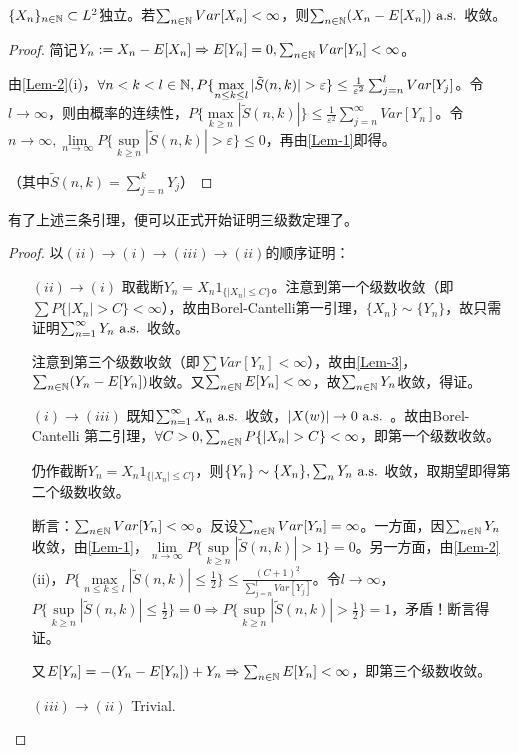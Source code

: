 \documentclass{ctexart}
\begin{document}
\begin{Lemma}\label{Lem-3}
  $\{X_{n}\}_{n\in\mathbb{N}}\subset L^{2}$独立。若$\sum_{n\in\mathbb{N}}Var[X_{n}]<\infty$，则$\sum_{n\in\mathbb{N}}(X_{n}-E[X_{n}])\text{ a.s. }$收敛。
\end{Lemma}
\begin{proof}
 简记$Y_{n}:=X_{n}-E[X_{n}]\Rightarrow E[Y_{n}]=0,\sum_{n\in\mathbb{N}}Var[Y_{n}]<\infty$。

  由\ref{Lem-2}(i)，$\forall n<k<l\in\N, P\{\max\limits_{n\leq k\leq l}|\tilde S(n,k)|>\varepsilon\}\leq \frac{1}{\varepsilon^{2}}\sum_{j=n}^{l}Var[Y_{j}]$。令$l\to\infty$，则由概率的连续性，$P\{\max\limits_{k\geq n}|\tilde{S}(n,k)|\}\leq\frac{1}{\varepsilon^{2}}\sum_{j=n}^{\infty}Var[Y_{n}]$。令$n\to\infty, \lim\limits_{n\to\infty}P\{\sup\limits_{k\geq n}|\tilde{S}(n,k)|>\varepsilon\}\leq 0$，再由\ref{Lem-1}即得。
  
  （其中$\tilde S(n,k)=\sum_{j=n}^{k}Y_{j}$）
\end{proof}
有了上述三条引理，便可以正式开始证明三级数定理了。
\begin{proof}
以$(ii)\to(i)\to (iii)\to (ii)$的顺序证明：
  \begin{itemize}
  \item[$(ii)\to (i)$] 取截断$Y_{n}=X_{n}1_{\{|X_{n}|\leq C\}}$。注意到第一个级数收敛（即$\sum P\{|X_{n}|>C\}<\infty$），故由Borel-Cantelli第一引理，$\{X_{n}\}\sim \{Y_{n}\}$，故只需证明$\sum_{n=1}^{\infty}Y_{n}\text{ a.s. }$收敛。

    注意到第三个级数收敛（即$\sum Var[Y_{n}]<\infty$），故由\ref{Lem-3}，$\sum_{n\in\mathbb{N}}(Y_{n}-E[Y_{n}])$收敛。又$\sum_{n\in\mathbb{N}}E[Y_{n}]<\infty$，故$\sum_{n\in\mathbb{N}} Y_{n}$收敛，得证。

  \item[$(i)\to (iii)$] 既知$\sum_{n=1}^{\infty} X_{n}\text{ a.s. }$收敛，$|X(w)|\to 0\text{ a.s. }$。故由Borel-Cantelli 第二引理，$\forall C>0,\sum_{n\in\N} P\{|X_{n}|>C\}<\infty$，即第一个级数收敛。

    仍作截断$Y_{n}=X_{n}1_{\{|X_{n}|\leq C\}}$，则$\{Y_{n}\}\sim\{X_{n}\},\sum_{n}Y_{n}\text{ a.s. }$收敛，取期望即得第二个级数收敛。

    断言：$\sum_{n\in\mathbb{N}} Var[Y_{n}]<\infty$。反设$\sum_{n\in\mathbb{N}}Var[Y_{n}]=\infty$。一方面，因$\sum_{n\in\mathbb{N}} Y_{n}$收敛，由\ref{Lem-1}，$\lim\limits_{n\to\infty}P\{\sup\limits_{k\geq n}|\tilde{S}(n,k)|>1\}=0$。另一方面，由\ref{Lem-2}(ii)，$P\{\max\limits_{n\leq k\leq l}|\tilde{S}(n,k)|\leq\frac{1}{2}\}\leq\frac{(C+1)^{2}}{\sum_{j=n}^{l}Var[Y_{j}]}$。令$l\to\infty$，$P\{\sup\limits_{k\geq n}|\tilde S(n,k)|\leq \frac{1}{2}\}=0\Rightarrow P\{\sup\limits_{k\geq n}|\tilde{S}(n,k)|>\frac{1}{2}\}=1$，矛盾！断言得证。

    又$E[Y_{n}]=-(Y_{n}-E[Y_{n}])+Y_{n}\Rightarrow \sum_{n\in\mathbb{N}} E[Y_{n}]<\infty$，即第三个级数收敛。
  \item[$(iii)\to (ii)$] Trivial.
  \end{itemize}
  \end{proof}
\end{document}
